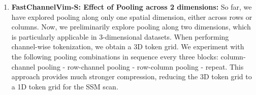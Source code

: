 \begin{enumerate}
\begin{table}[!h]
\begin{center}
{\begin{tabular}{lcc}
            \bottomrule    
    \end{tabular}
}
\end{center}
    \label{tab:jumpcp_results_meanmaxatt}
\end{table}


\item  \textbf{FastChannelVim-S: Effect of Pooling across 2 dimensions:} So far, we have explored pooling along only one spatial dimension, either across rows or columns. Now, we preliminarily explore pooling along two dimensions, which is particularly applicable in 3-dimensional datasets. When performing channel-wise tokenization, we obtain a 3D token grid. We experiment with the following pooling combinations in sequence every three blocks: column-channel pooling - row-channel pooling - row-column pooling - repeat. This approach provides much stronger compression, reducing the 3D token grid to a 1D token grid for the SSM scan.

\begin{table}[!h]
    \caption{FastChannelVim-S: Effect of Pooling across 2 dimensions on 160-way perturbed gene prediction on JUMP-CP dataset. All methods use hierarchical channel sampling~\cite{channelvit} for training, and testing is done using all 8 channels. Each cell image is of resolution $224 \times 224 \times 8$.}
    \begin{center}
\end{center}
    \label{tab:jumpcp_results_2dpooling}
\end{table}



\end{enumerate}
